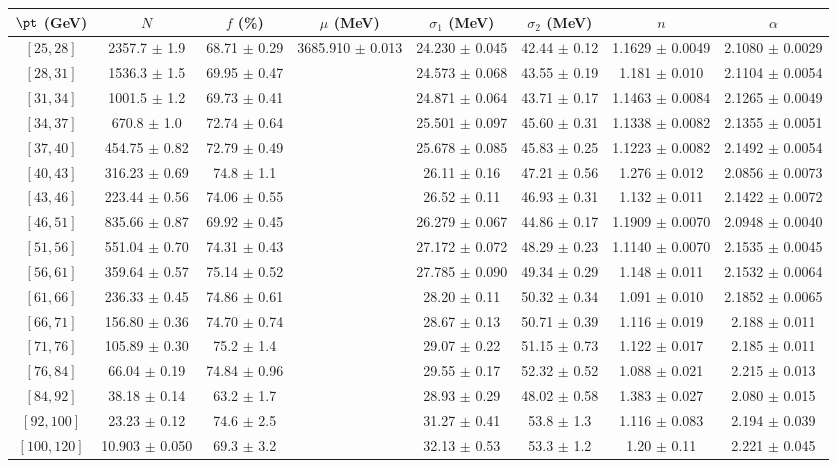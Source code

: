 \begin{tabular}{c||c|c|c|c|c|c|c}
$\pt$ (GeV) & $N$ & $f$ (\%) & $\mu$ (MeV) & $\sigma_1$ (MeV) & $\sigma_2$ (MeV) & $n$ & $\alpha$ \\
\hline
$[25, 28]$ & 2357.7 $\pm$ 1.9 & 68.71 $\pm$ 0.29 & \multirow{17}{*}{3685.910 $\pm$ 0.013} & 24.230 $\pm$ 0.045 & 42.44 $\pm$ 0.12 & 1.1629 $\pm$ 0.0049 & 2.1080 $\pm$ 0.0029\\
$[28, 31]$ & 1536.3 $\pm$ 1.5 & 69.95 $\pm$ 0.47 &  & 24.573 $\pm$ 0.068 & 43.55 $\pm$ 0.19 & 1.181 $\pm$ 0.010 & 2.1104 $\pm$ 0.0054\\
$[31, 34]$ & 1001.5 $\pm$ 1.2 & 69.73 $\pm$ 0.41 &  & 24.871 $\pm$ 0.064 & 43.71 $\pm$ 0.17 & 1.1463 $\pm$ 0.0084 & 2.1265 $\pm$ 0.0049\\
$[34, 37]$ & 670.8 $\pm$ 1.0 & 72.74 $\pm$ 0.64 &  & 25.501 $\pm$ 0.097 & 45.60 $\pm$ 0.31 & 1.1338 $\pm$ 0.0082 & 2.1355 $\pm$ 0.0051\\
$[37, 40]$ & 454.75 $\pm$ 0.82 & 72.79 $\pm$ 0.49 &  & 25.678 $\pm$ 0.085 & 45.83 $\pm$ 0.25 & 1.1223 $\pm$ 0.0082 & 2.1492 $\pm$ 0.0054\\
$[40, 43]$ & 316.23 $\pm$ 0.69 & 74.8 $\pm$ 1.1 &  & 26.11 $\pm$ 0.16 & 47.21 $\pm$ 0.56 & 1.276 $\pm$ 0.012 & 2.0856 $\pm$ 0.0073\\
$[43, 46]$ & 223.44 $\pm$ 0.56 & 74.06 $\pm$ 0.55 &  & 26.52 $\pm$ 0.11 & 46.93 $\pm$ 0.31 & 1.132 $\pm$ 0.011 & 2.1422 $\pm$ 0.0072\\
$[46, 51]$ & 835.66 $\pm$ 0.87 & 69.92 $\pm$ 0.45 &  & 26.279 $\pm$ 0.067 & 44.86 $\pm$ 0.17 & 1.1909 $\pm$ 0.0070 & 2.0948 $\pm$ 0.0040\\
$[51, 56]$ & 551.04 $\pm$ 0.70 & 74.31 $\pm$ 0.43 &  & 27.172 $\pm$ 0.072 & 48.29 $\pm$ 0.23 & 1.1140 $\pm$ 0.0070 & 2.1535 $\pm$ 0.0045\\
$[56, 61]$ & 359.64 $\pm$ 0.57 & 75.14 $\pm$ 0.52 &  & 27.785 $\pm$ 0.090 & 49.34 $\pm$ 0.29 & 1.148 $\pm$ 0.011 & 2.1532 $\pm$ 0.0064\\
$[61, 66]$ & 236.33 $\pm$ 0.45 & 74.86 $\pm$ 0.61 &  & 28.20 $\pm$ 0.11 & 50.32 $\pm$ 0.34 & 1.091 $\pm$ 0.010 & 2.1852 $\pm$ 0.0065\\
$[66, 71]$ & 156.80 $\pm$ 0.36 & 74.70 $\pm$ 0.74 &  & 28.67 $\pm$ 0.13 & 50.71 $\pm$ 0.39 & 1.116 $\pm$ 0.019 & 2.188 $\pm$ 0.011\\
$[71, 76]$ & 105.89 $\pm$ 0.30 & 75.2 $\pm$ 1.4 &  & 29.07 $\pm$ 0.22 & 51.15 $\pm$ 0.73 & 1.122 $\pm$ 0.017 & 2.185 $\pm$ 0.011\\
$[76, 84]$ & 66.04 $\pm$ 0.19 & 74.84 $\pm$ 0.96 &  & 29.55 $\pm$ 0.17 & 52.32 $\pm$ 0.52 & 1.088 $\pm$ 0.021 & 2.215 $\pm$ 0.013\\
$[84, 92]$ & 38.18 $\pm$ 0.14 & 63.2 $\pm$ 1.7 &  & 28.93 $\pm$ 0.29 & 48.02 $\pm$ 0.58 & 1.383 $\pm$ 0.027 & 2.080 $\pm$ 0.015\\
$[92, 100]$ & 23.23 $\pm$ 0.12 & 74.6 $\pm$ 2.5 &  & 31.27 $\pm$ 0.41 & 53.8 $\pm$ 1.3 & 1.116 $\pm$ 0.083 & 2.194 $\pm$ 0.039\\
$[100, 120]$ & 10.903 $\pm$ 0.050 & 69.3 $\pm$ 3.2 &  & 32.13 $\pm$ 0.53 & 53.3 $\pm$ 1.2 & 1.20 $\pm$ 0.11 & 2.221 $\pm$ 0.045\\
\end{tabular}
